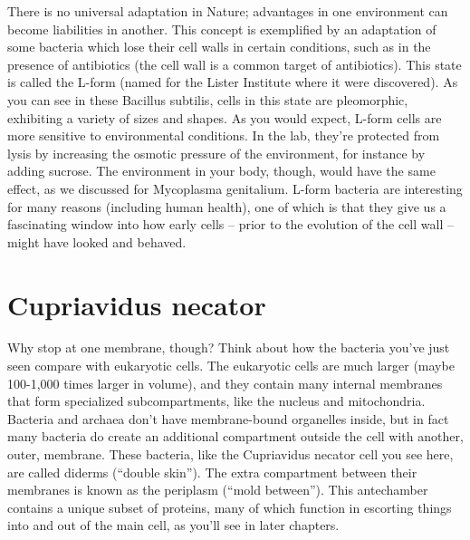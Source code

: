 \documentclass[]{tufte-book}
\begin{document}
There is no universal adaptation in Nature; advantages in one
environment can become liabilities in another. This concept is
exemplified by an adaptation of some bacteria which lose their cell
walls in certain conditions, such as in the presence of antibiotics (the
cell wall is a common target of antibiotics). This state is called the
L-form (named for the Lister Institute where it were discovered). As you
can see in these Bacillus subtilis, cells in this state are pleomorphic,
exhibiting a variety of sizes and shapes. As you would expect, L-form
cells are more sensitive to environmental conditions. In the lab,
they're protected from lysis by increasing the osmotic pressure of the
environment, for instance by adding sucrose. The environment in your
body, though, would have the same effect, as we discussed for Mycoplasma
genitalium. L-form bacteria are interesting for many reasons (including
human health), one of which is that they give us a fascinating window
into how early cells -- prior to the evolution of the cell wall -- might
have looked and behaved.

\section{Cupriavidus necator}\label{cupriavidus-necator}

Why stop at one membrane, though? Think about how the bacteria you've
just seen compare with eukaryotic cells. The eukaryotic cells are much
larger (maybe 100-1,000 times larger in volume), and they contain many
internal membranes that form specialized subcompartments, like the
nucleus and mitochondria. Bacteria and archaea don't have membrane-bound
organelles inside, but in fact many bacteria do create an additional
compartment outside the cell with another, outer, membrane. These
bacteria, like the Cupriavidus necator cell you see here, are called
diderms (``double skin''). The extra compartment between their membranes
is known as the periplasm (``mold between''). This antechamber contains
a unique subset of proteins, many of which function in escorting things
into and out of the main cell, as you'll see in later chapters.
\end{document}
